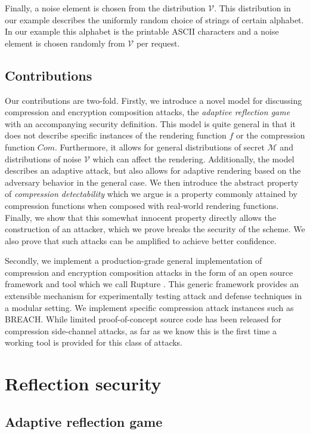 \documentclass[conference, letterpaper, 10pt]{IEEEtran}
\begin{document}
Finally, a noise element is chosen from the distribution $\mathcal{V}$. This
distribution in our example describes the uniformly random choice of strings of
certain alphabet. In our example this alphabet is the printable ASCII characters
and a noise element is chosen randomly from $\mathcal{V}$ per request.

\subsection{Contributions}
Our contributions are two-fold. Firstly, we introduce a novel model for discussing
compression and encryption composition attacks, the \textit{adaptive reflection
game} with an accompanying security definition. This model is quite general in
that it does not describe specific instances of the rendering function $f$ or
the compression function $Com$. Furthermore, it allows for general distributions
of secret $\mathcal{M}$ and distributions of noise $\mathcal{V}$ which can
affect the rendering. Additionally, the model describes an adaptive attack,
but also allows for adaptive rendering based on the adversary behavior in the
general case. We then introduce the abstract property of \textit{compression detectability}
which we argue is a property commonly attained by compression functions when
composed with real-world rendering functions. Finally, we show that this somewhat
innocent property directly allows the construction of an attacker, which we
prove breaks the security of the scheme. We also prove that such
attacks can be amplified to achieve better confidence.

Secondly, we implement a production-grade general implementation of compression
and encryption composition attacks in the form of an open source framework and
tool which we call Rupture \cite{c7}. This generic framework provides an
extensible mechanism for experimentally testing attack and defense techniques
in a modular setting. We implement specific compression attack instances such
as BREACH. While limited proof-of-concept source code has been released for
compression side-channel attacks, as far as we know this is the first time
a working tool is provided for this class of attacks.

\section{Reflection security}\label{sec:refsec}

\subsection{Adaptive reflection game}\label{subsec:refsecgame}
\end{document}
